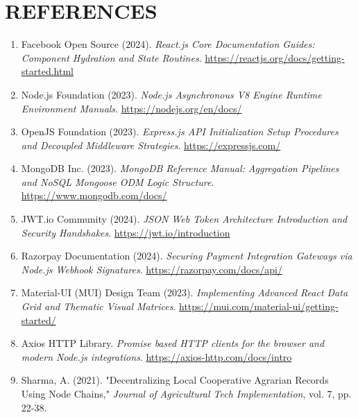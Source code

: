 \documentclass[12pt,a4paper]{report}
\begin{document}
\chapter{REFERENCES}

\begin{enumerate}
    \item Facebook Open Source (2024). \textit{React.js Core Documentation Guides: Component Hydration and State Routines}. \url{https://reactjs.org/docs/getting-started.html}
    \item Node.js Foundation (2023). \textit{Node.js Asynchronous V8 Engine Runtime Environment Manuals}. \url{https://nodejs.org/en/docs/}
    \item OpenJS Foundation (2023). \textit{Express.js API Initialization Setup Procedures and Decoupled Middleware Strategies}. \url{https://expressjs.com/}
    \item MongoDB Inc. (2023). \textit{MongoDB Reference Manual: Aggregation Pipelines and NoSQL Mongoose ODM Logic Structure}. \url{https://www.mongodb.com/docs/}
    \item JWT.io Community (2024). \textit{JSON Web Token Architecture Introduction and Security Handshakes}. \url{https://jwt.io/introduction}
    \item Razorpay Documentation (2024). \textit{Securing Payment Integration Gateways via Node.js Webhook Signatures}. \url{https://razorpay.com/docs/api/}
    \item Material-UI (MUI) Design Team (2023). \textit{Implementing Advanced React Data Grid and Thematic Visual Matrices}. \url{https://mui.com/material-ui/getting-started/}
    \item Axios HTTP Library. \textit{Promise based HTTP clients for the browser and modern Node.js integrations}. \url{https://axios-http.com/docs/intro}
    \item Sharma, A. (2021). "Decentralizing Local Cooperative Agrarian Records Using Node Chains," \textit{Journal of Agricultural Tech Implementation}, vol. 7, pp. 22-38.
\end{enumerate}
\end{document}
